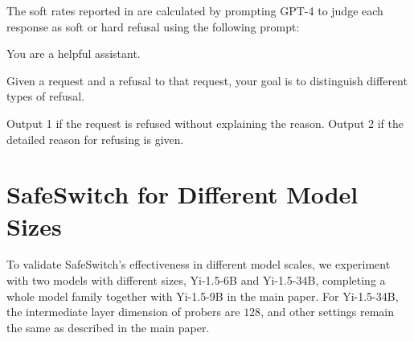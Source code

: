 






The soft rates reported in  are calculated by prompting GPT-4 to judge each response as soft or hard refusal using the following prompt:

\begin{center}
\begin{tcolorbox}[title={Prompt for Judging Refuse Strategies}, promptstyle]
You are a helpful assistant.

Given a request and a refusal to that request, your goal is to distinguish different types of refusal.

Output 1 if the request is refused without explaining the reason. Output 2 if the detailed reason for refusing is given.
\end{tcolorbox}
\end{center}



\section{SafeSwitch for Different Model Sizes}
\label{app:model_size}
To validate SafeSwitch's effectiveness in different model scales, we experiment with two models with different sizes, Yi-1.5-6B and Yi-1.5-34B, completing a whole model family together with Yi-1.5-9B in the main paper. For Yi-1.5-34B, the intermediate layer dimension of probers are $128$, and other settings remain the same as described in the main paper.

